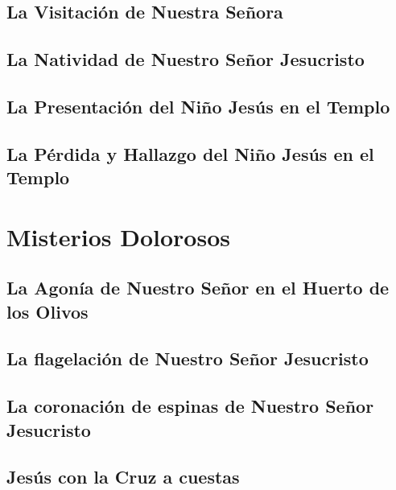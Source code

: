 \documentclass[a4paper,11pt, oneside]{report}
\begin{document}
            
    \subsection{La Visitación de Nuestra Señora}
      

            
    \subsection{La Natividad de Nuestro Señor Jesucristo}
      


    \subsection{La Presentación del Niño Jesús en el Templo}
      

            
    \subsection{La Pérdida y Hallazgo del Niño Jesús en el Templo}
      
        
  \section{Misterios Dolorosos}
    
    \subsection{La Agonía de Nuestro Señor en el Huerto de los Olivos}
      
      

    \subsection{La flagelación de Nuestro Señor Jesucristo}
      

      
    \subsection{La coronación de espinas de Nuestro Señor Jesucristo}
      


    \subsection{Jesús con la Cruz a cuestas}
      
\end{document}
